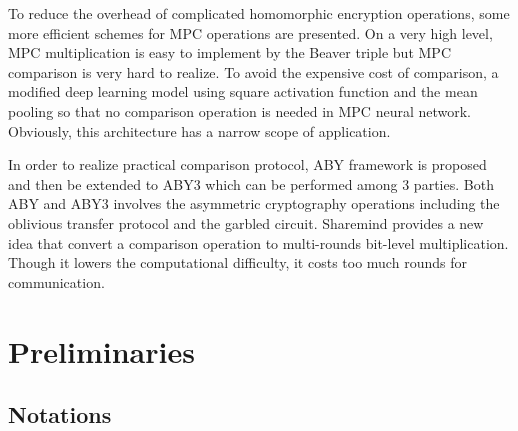 \documentclass[letterpaper]{article} %
\begin{document}
    To reduce the overhead of complicated homomorphic encryption operations,
    some more efficient schemes for MPC operations are presented.
    On a very high level, MPC multiplication is easy to implement by the Beaver triple \cite{EfficientMultipartyProtocols}
    but MPC comparison is very hard to realize.
    To avoid the expensive cost of comparison,
    a modified deep learning model \cite{CryptoNets} using square activation function and the mean pooling so that
    no comparison operation is needed in MPC neural network.
    Obviously, this architecture has a narrow scope of application.

    In order to realize practical comparison protocol, ABY framework \cite{ABY} is proposed
    and then be extended to ABY3 \cite{ABY3} which can be performed among 3 parties.
    Both ABY and ABY3 involves the asymmetric cryptography operations
    including the oblivious transfer protocol and the garbled circuit.
    Sharemind provides a new idea that convert a comparison operation to
    multi-rounds bit-level multiplication.
    Though it lowers the computational difficulty, it costs too much rounds for
    communication.











\section{Preliminaries}
    \subsection{Notations}
\end{document}

